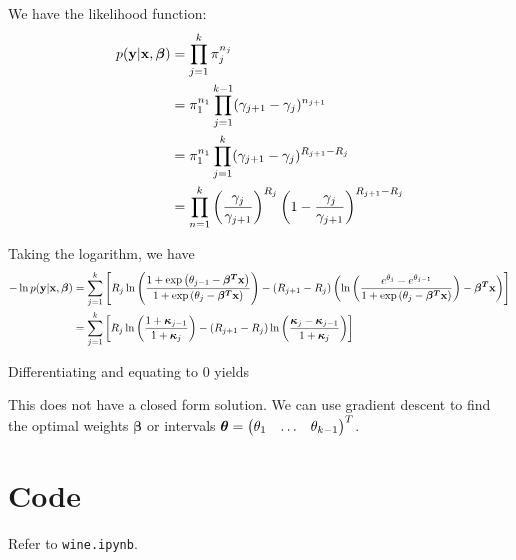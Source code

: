 \documentclass[reqno]{amsart}
\begin{document}
    We have the likelihood function:
    \begin{align}
        \begin{split}
            p(\mathbf{y}|\mathbf{x}, \boldsymbol{\beta}) &= \prod_{j = 1}^{k} \pi_j^{n_j} \\
            &= \pi_1^{n_1} \prod_{j = 1}^{k-1} (\gamma_{j + 1} - \gamma_j)^{n_{j + 1}} \\
            &= \pi_1^{n_1} \prod_{j = 1}^{k} (\gamma_{j + 1} - \gamma_j)^{R_{j + 1} - R_j}  \\
            &= \prod_{n = 1}^{k} \left(\frac{\gamma_j}{\gamma_{j + 1}}\right)^{R_j} \left(1 - \frac{\gamma_j}{\gamma_{j + 1}}\right)^{R_{j + 1} - R_j} \\
        \end{split}
    \end{align}

    Taking the logarithm, we have
    \begin{align}
        \begin{split}
            -\ln p(\mathbf{y}|\mathbf{x}, \boldsymbol{\beta}) &= 
            \sum_{j = 1}^{k} \left[R_j \ln \left(\frac{1 + \exp \left(\theta_{j - 1} - \boldsymbol{\beta^T}\mathbf{x}\right)}{1 + \exp \left(\theta_j - \boldsymbol{\beta^T}\mathbf{x}\right)}\right) 
            - (R_{j + 1} - R_j) \left(\ln \left(\frac{e^{\theta_j} - e^{\theta_{j - 1}}}{1 + \exp \left(\theta_j - \boldsymbol{\beta^T}\mathbf{x}\right)}\right) - \boldsymbol{\beta^T}\mathbf{x}\right)\right] \\
            &= \sum_{j = 1}^{k} \left[R_j \ln \left(\frac{1 + \boldsymbol{\kappa}_{j - 1}}{1 + \boldsymbol{\kappa}_j}\right) 
            - (R_{j + 1} - R_j) \ln \left(\frac{\boldsymbol{\kappa}_j - \boldsymbol{\kappa}_{j - 1}}{1 + \boldsymbol{\kappa}_j}\right)\right] 
        \end{split}
    \end{align}

    Differentiating and equating to 0 yields 
            

    This does not have a closed form solution. We can use gradient descent to find the optimal weights \(\boldsymbol{\beta}\) or intervals \(\boldsymbol{\theta} = \begin{pmatrix}\theta_1 & \ldots & \theta_{k - 1}\end{pmatrix}^T\).

    \section{Code}

    Refer to \texttt{wine.ipynb}.
\end{document}
